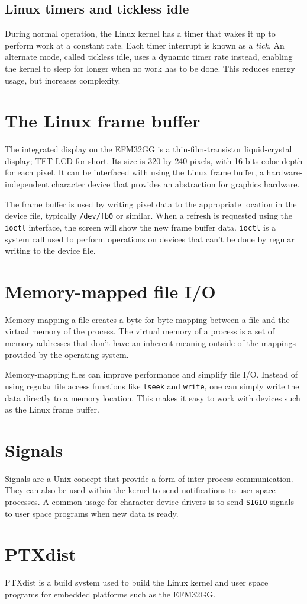 \subsection{Linux timers and tickless idle}\label{sec:tickless}
During normal operation, the Linux kernel has a timer that wakes it up to perform work at a constant rate. Each timer interrupt is known as a \textit{tick}. An alternate mode, called tickless idle, uses a dynamic timer rate instead, enabling the kernel to sleep for longer when no work has to be done. This reduces energy usage, but increases complexity.

\section{The Linux frame buffer}
The integrated display on the EFM32GG is a thin-film-transistor liquid-crystal display; TFT LCD for short. Its size is 320 by 240 pixels, with 16 bits color depth for each pixel.  It can be interfaced with using the Linux frame buffer, a hardware-independent character device that provides an abstraction for graphics hardware\cite{kernelframebuffer}.

The frame buffer is used by writing pixel data to the appropriate location in the device file, typically \texttt{/dev/fb0} or similar. When a refresh is requested using the \texttt{ioctl} interface, the screen will show the new frame buffer data. \texttt{ioctl} is a system call used to perform operations on devices that can't be done by regular writing to the device file.

\section{Memory-mapped file I/O}
Memory-mapping a file creates a byte-for-byte mapping between a file and the virtual memory of the process. The virtual memory of a process is a set of memory addresses that don't have an inherent meaning outside of the mappings provided by the operating system.

Memory-mapping files can improve performance and simplify file I/O. Instead of using regular file access functions like \texttt{lseek} and \texttt{write}, one can simply write the data directly to a memory location. This makes it easy to work with devices such as the Linux frame buffer.

\section{Signals}
Signals are a Unix concept that provide a form of inter-process communication. They can also be used within the kernel to send notifications to user space processes. A common usage for character device drivers is to send \texttt{SIGIO} signals to user space programs when new data is ready.

\section{PTXdist}
PTXdist is a build system used to build the Linux kernel and user space programs for embedded platforms such as the EFM32GG.